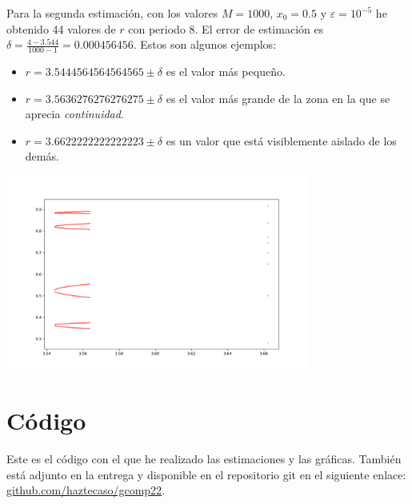 \documentclass[10pt, spanish]{article}
\theoremstyle{definition}
\theoremstyle{break}
\begin{document}
Para la segunda estimación, con los valores $M=1000$, $x_0=0.5$ y
$\varepsilon=10^{-5}$ he obtenido 44 valores de $r$ con periodo $8$. El error de
estimación es $\delta = \frac{4-3.544}{1000-1}=0.000456456$. Estos son
algunos ejemplos:
\begin{itemize}
    \item $r = 3.5444564564564565\pm \delta$ es el valor más pequeño.
    \item $r= 3.5636276276276275\pm\delta$ es el valor más grande de la zona en
        la que se aprecia \textit{continuidad}.
    \item $r=3.6622222222222223\pm\delta$ es un valor que está
        visiblemente aislado de los demás.
\end{itemize}

\begin{center}
\includegraphics[width=10cm]{plot02}
\end{center}

\section{Código}

Este es el código con el que he realizado las estimaciones y las gráficas.
También está adjunto en la entrega y disponible en el repositorio git en el
siguiente enlace: \href{https://www.github.com/haztecaso/gcomp22}{github.com/haztecaso/gcomp22}.

% 

\end{document}
